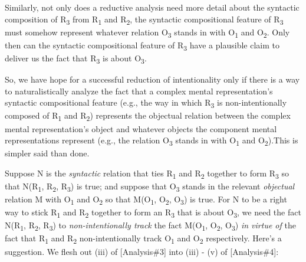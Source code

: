 \documentclass[a4paper,12pt]{article}
\begin{document}
Similarly, not only does a reductive analysis need more detail about the syntactic composition of R\textsubscript{3} from R\textsubscript{1} and R\textsubscript{2}, the syntactic compositional feature of R\textsubscript{3} must somehow represent whatever relation O\textsubscript{3} stands in with O\textsubscript{1} and O\textsubscript{2}. Only then can the syntactic compositional feature of R\textsubscript{3} have a plausible claim to deliver us the fact that R\textsubscript{3} is about O\textsubscript{3}.

So, we have hope for a successful reduction of intentionality only if there is a way to naturalistically analyze the fact that a complex mental representation's syntactic compositional feature (e.g., the way in which R\textsubscript{3} is non-intentionally composed of R\textsubscript{1} and R\textsubscript{2}) represents the objectual relation between the complex mental representation's object and whatever objects the component mental representations represent (e.g., the relation O\textsubscript{3} stands in with O\textsubscript{1} and O\textsubscript{2}).\footnotemark This is simpler said than done.


Suppose N is the \emph{syntactic} relation that ties R\textsubscript{1} and R\textsubscript{2} together to form R\textsubscript{3} so that N(R\textsubscript{1}, R\textsubscript{2}, R\textsubscript{3}) is true; and suppose that O\textsubscript{3} stands in the relevant \emph{objectual} relation M with O\textsubscript{1} and O\textsubscript{2} so that M(O\textsubscript{1}, O\textsubscript{2}, O\textsubscript{3}) is true. For N to be a right way to stick R\textsubscript{1} and R\textsubscript{2} together to form an R\textsubscript{3} that is about O\textsubscript{3}, we need the fact N(R\textsubscript{1}, R\textsubscript{2}, R\textsubscript{3}) to \emph{non-intentionally track} the fact M(O\textsubscript{1}, O\textsubscript{2}, O\textsubscript{3}) \emph{in virtue of} the fact that R\textsubscript{1} and R\textsubscript{2} non-intentionally track O\textsubscript{1} and O\textsubscript{2} respectively. Here's a suggestion. We flesh out (iii) of [Analysis\#3] into (iii) - (v) of [Analysis\#4]:
\end{document}
